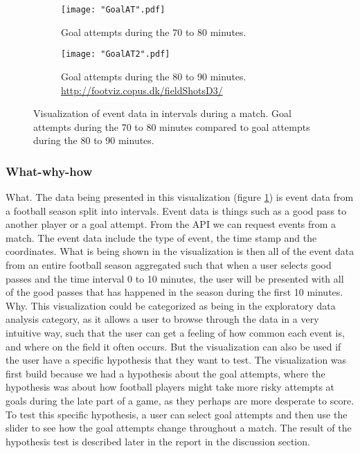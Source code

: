 \documentclass[Report.tex]{subfiles}
\begin{document}
\begin{figure}
\center
\begin{subfigure}[b]{0.7\linewidth}
\texttt{[image: "GoalAT".pdf]}
\caption{Goal attempts during the 70 to 80 minutes.}
\end{subfigure}
\begin{subfigure}[b]{0.7\textwidth}
\texttt{[image: "GoalAT2".pdf]}
\caption{Goal attempts during the 80 to 90 minutes. \url{http://footviz.copus.dk/fieldShotsD3/}}
\end{subfigure}
\caption{Visualization of event data in intervals during a match. Goal attempts during the 70 to 80 minutes compared to goal attempts during the 80 to 90 minutes.}

\label{Fig:Events}
\end{figure}

\subsubsection{What-why-how}
What. The data being presented in this visualization (figure \ref{Fig:Events}) is event data from a football season split into intervals. Event data is things such as a good pass to another player or a goal attempt. From the API we can request events from a match. The event data include the type of event, the time stamp and the coordinates. What is being shown in the visualization is then all of the event data from an entire football season aggregated such that when a user selects good passes and the time interval 0 to 10 minutes, the user will be presented with all of the good passes that has happened in the season during the first 10 minutes.\\

\noindent Why. This visualization could be categorized as being in the exploratory data analysis category, as it allows a user to browse through the data in a very intuitive way, such that the user can get a feeling of how common each event is, and where on the field it often occurs. But the visualization can also be used if the user have a specific hypothesis that they want to test. The visualization was first build because we had a hypothesis about the goal attempts, where the hypothesis was about how football players might take more risky attempts at goals during the late part of a game, as they perhaps are more desperate to score. To test this specific hypothesis, a user can select goal attempts and then use the slider to see how the goal attempts change throughout a match. The result of the hypothesis test is described later in the report in the discussion section.\\
\end{document}
